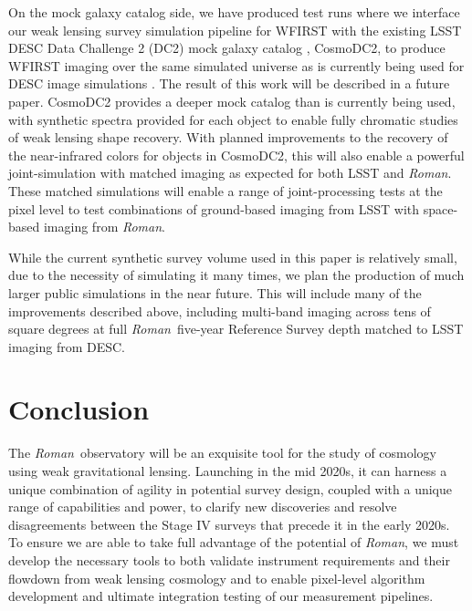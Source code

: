 \documentclass[usenatbib]{mnras}
\newcommand{\wfirst}{{\slshape Roman}}
\begin{document}
On the mock galaxy catalog side, we have produced test runs where we interface our weak lensing survey simulation pipeline for WFIRST with the existing LSST DESC Data Challenge 2 (DC2) mock galaxy catalog \citep{2019arXiv190706530K}, CosmoDC2, to produce WFIRST imaging over the same simulated universe as is currently being used for DESC image simulations \citep{dc2all}.  %
The result of this work will be described in a future paper. CosmoDC2 provides a deeper mock catalog than is currently being used, with synthetic spectra provided for each object to enable fully chromatic studies of weak lensing shape recovery. 
With planned improvements to the recovery of the near-infrared colors for objects in CosmoDC2, this will also enable a powerful joint-simulation with matched imaging as expected for both LSST and \wfirst. 
These matched simulations will enable a range of joint-processing tests at the pixel level to test combinations of ground-based imaging from LSST with space-based imaging from \wfirst.

While the current synthetic survey volume used in this paper is relatively small, due to the necessity of simulating it many times, we plan the production of much larger public simulations in the near future. 
This will include many of the improvements described above, including multi-band imaging across tens of square degrees at full \wfirst\ five-year Reference Survey depth matched to LSST imaging from DESC. 

\section{Conclusion}\label{sec:conclusion}

The \wfirst\ observatory will be an exquisite tool for the study of cosmology using weak gravitational lensing. 
Launching in the mid 2020s, it can harness a unique combination of agility in potential survey design, coupled with a unique range of capabilities and power, to clarify new discoveries and resolve disagreements between the Stage IV surveys that precede it in the early 2020s. 
To ensure we are able to take full advantage of the potential of \wfirst, we must develop the necessary tools to both validate instrument requirements and their flowdown from weak lensing cosmology and to enable pixel-level algorithm development and ultimate integration testing of our measurement pipelines.
\end{document}
